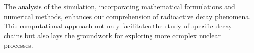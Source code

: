 \documentclass[12pt]{article}
\begin{document}
The analysis of the simulation, incorporating mathematical formulations and numerical methods, enhances our comprehension of radioactive decay phenomena. This computational approach not only facilitates the study of specific decay chains but also lays the groundwork for exploring more complex nuclear processes.


\end{document}
